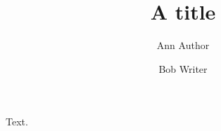 \documentclass{compositio}
\title{A title}
\author{Ann Author}
\author{Bob Writer}
\begin{document}
\maketitle
Text.
\end{document}
